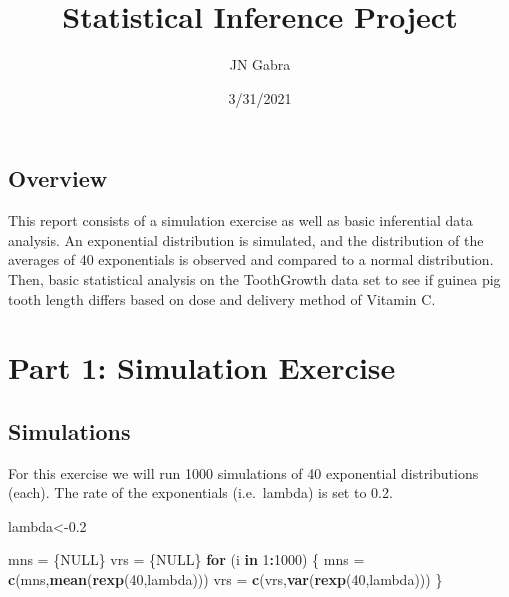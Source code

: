 \documentclass[
]{article}
\title{Statistical Inference Project}
\author{JN Gabra}
\date{3/31/2021}
\newenvironment{Shaded}{\begin{snugshade}}{\end{snugshade}}
\newcommand{\ControlFlowTok}[1]{\textcolor[rgb]{0.13,0.29,0.53}{\textbf{#1}}}
\newcommand{\DecValTok}[1]{\textcolor[rgb]{0.00,0.00,0.81}{#1}}
\newcommand{\FloatTok}[1]{\textcolor[rgb]{0.00,0.00,0.81}{#1}}
\newcommand{\KeywordTok}[1]{\textcolor[rgb]{0.13,0.29,0.53}{\textbf{#1}}}
\newcommand{\NormalTok}[1]{#1}
\newcommand{\OperatorTok}[1]{\textcolor[rgb]{0.81,0.36,0.00}{\textbf{#1}}}
\newcommand{\OtherTok}[1]{\textcolor[rgb]{0.56,0.35,0.01}{#1}}
\newcommand{\StringTok}[1]{\textcolor[rgb]{0.31,0.60,0.02}{#1}}
\begin{document}
\maketitle

\hypertarget{overview}{%
\subsection{Overview}\label{overview}}

This report consists of a simulation exercise as well as basic
inferential data analysis. An exponential distribution is simulated, and
the distribution of the averages of 40 exponentials is observed and
compared to a normal distribution. Then, basic statistical analysis on
the ToothGrowth data set to see if guinea pig tooth length differs based
on dose and delivery method of Vitamin C.

\hypertarget{part-1-simulation-exercise}{%
\section{Part 1: Simulation Exercise}\label{part-1-simulation-exercise}}

\hypertarget{simulations}{%
\subsection{Simulations}\label{simulations}}

For this exercise we will run 1000 simulations of 40 exponential
distributions (each). The rate of the exponentials (i.e.~lambda) is set
to 0.2.

\begin{Shaded}
\begin{Highlighting}[]
\NormalTok{lambda\textless{}{-}}\FloatTok{0.2}

\NormalTok{mns =}\StringTok{ }\NormalTok{\{}\OtherTok{NULL}\NormalTok{\}}
\NormalTok{vrs =}\StringTok{ }\NormalTok{\{}\OtherTok{NULL}\NormalTok{\}}
\ControlFlowTok{for}\NormalTok{ (i }\ControlFlowTok{in} \DecValTok{1}\OperatorTok{:}\DecValTok{1000}\NormalTok{) \{}
\NormalTok{      mns =}\StringTok{ }\KeywordTok{c}\NormalTok{(mns,}\KeywordTok{mean}\NormalTok{(}\KeywordTok{rexp}\NormalTok{(}\DecValTok{40}\NormalTok{,lambda)))}
\NormalTok{      vrs =}\StringTok{ }\KeywordTok{c}\NormalTok{(vrs,}\KeywordTok{var}\NormalTok{(}\KeywordTok{rexp}\NormalTok{(}\DecValTok{40}\NormalTok{,lambda)))}
\NormalTok{\}}
\end{Highlighting}
\end{Shaded}
\end{document}
